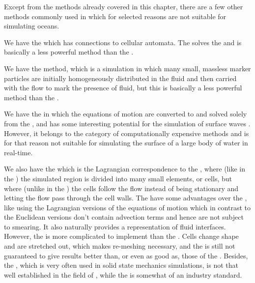 Except from the methods already covered in this chapter, there are a few other methods commonly used in \CFD which for selected reasons are not suitable for simulating oceans.

We have the \LBM which has connections to cellular automata. The \LBM solves the  and is basically a less powerful \CFD method than the \FVM.

We have the \MAC method, which is a \FVM simulation in which many small, massless marker particles are initially homogeneously distributed in the fluid and then carried with the flow to mark the presence of fluid, but this is basically a less powerful method than the .

We have the \BEM in which the equations of motion are converted to  and solved solely from the \boundaries, and has some interesting potential for the simulation of surface waves \citep{advancesinnumericalsimulationofnonlinearwaterwaves}. However, it belongs to the category of computationally expensive methods and is for that reason not suitable for simulating the surface of a large body of water in real-time.

We also have the \FEM which is the Lagrangian correspondence to the \FVM, where (like in the \FVM) the simulated region is divided into many small elements, or cells, but where (unlike in the \FVM) the cells follow the flow instead of being stationary and letting the flow pass through the cell walls. The \FEM have some advantages over the \FVM, like using the Lagrangian versions of the equations of motion which in contrast to the Euclidean versions don't contain advection terms and hence are not subject to smearing. It also naturally provides a representation of fluid interfaces. However, the \FEM is more complicated to implement than the \FVM. Cells change shape and are stretched out, which makes re-meshing necessary, and the \FEM is still not guaranteed to give results better than, or even as good as, those of the \FVM. Besides, the \FEM, which is very often used in solid state mechanics simulations, is not that well established in the field of \CFD, while the \FVM is somewhat of an industry standard.
